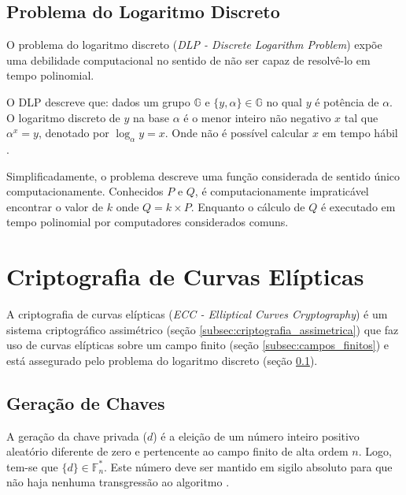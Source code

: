 \documentclass[12pt]{article}
\begin{document}
        \subsection{Problema do Logaritmo Discreto}
        \label{subsec:logaritmo_discreto}

            O problema do logaritmo discreto (\textit{DLP - Discrete Logarithm Problem}) expõe uma debilidade computacional no sentido de não ser capaz de resolvê-lo em tempo polinomial.
            
            O DLP descreve que: dados um grupo $\mathbb{G}$ e $\{y, \alpha\} \in \mathbb{G}$ no qual $y$ é potência de $\alpha$. O logaritmo discreto de $y$ na base $\alpha$ é o menor inteiro não negativo $x$ tal que $\alpha^x = y$, denotado por $\log_{\alpha}y = x$. Onde não é possível calcular $x$ em tempo hábil \cite{vania2011curvas} \cite{hankerson2004guide}.

            Simplificadamente, o problema descreve uma função considerada de sentido único computacionamente. Conhecidos $P$ e $Q$, é computacionamente impraticável encontrar o valor de $k$ onde $Q = k \times P$. Enquanto o cálculo de $Q$ é executado em tempo polinomial por computadores considerados comuns.

    \section{Criptografia de Curvas Elípticas}
    \label{sec:criptografia_curvas_elipticas}

        A criptografia de curvas elípticas (\textit{ECC - Elliptical Curves Cryptography}) é um sistema criptográfico assimétrico (seção \ref{subsec:criptografia_assimetrica}) que faz uso de curvas elípticas sobre um campo finito (seção \ref{subsec:campos_finitos}) e está assegurado pelo problema do logaritmo discreto (seção \ref{subsec:logaritmo_discreto}).

        \subsection{Geração de Chaves}
        \label{subsec:geracao_de_chaves}

            A geração da chave privada ($d$) é a eleição de um número inteiro positivo aleatório diferente de zero e pertencente ao campo finito de alta ordem $n$. Logo, tem-se que $\{d\} \in \mathbb{F}^*_n$. Este número deve ser mantido em sigilo absoluto para que não haja nenhuma transgressão ao algoritmo \cite{dahab2000overview}.
\end{document}
